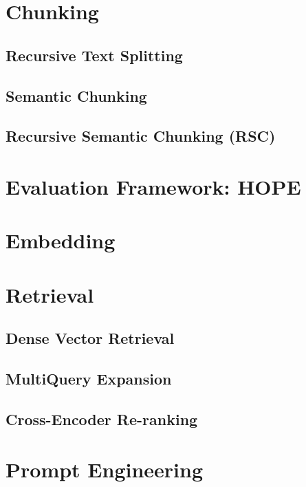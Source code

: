 \documentclass[
  english,
  12pt,
]{report}
\begin{document}
\section{Chunking}\label{chunking}

\subsection{Recursive Text Splitting}\label{recursive-text-splitting}

\subsection{Semantic Chunking}\label{semantic-chunking}

\subsection{Recursive Semantic Chunking
(RSC)}\label{recursive-semantic-chunking-rsc}

\section{Evaluation Framework: HOPE}\label{evaluation-framework-hope}

\section{Embedding}\label{embedding}

\section{Retrieval}\label{retrieval}

\subsection{Dense Vector Retrieval}\label{dense-vector-retrieval}

\subsection{MultiQuery Expansion}\label{multiquery-expansion}

\subsection{Cross-Encoder Re-ranking}\label{cross-encoder-re-ranking}

\section{Prompt Engineering}\label{prompt-engineering}
\end{document}
